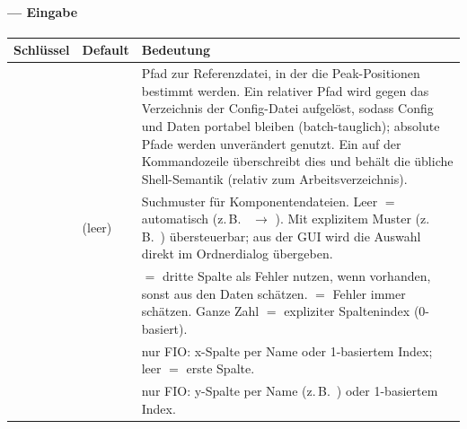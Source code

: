 \documentclass[11pt,a4paper]{article}
\begin{document}
\paragraph{\code{[input]} --- Eingabe}
\begin{table}[h]\small\centering
\begin{tabularx}{\linewidth}{@{}l l L@{}}
\toprule
\textbf{Schl\"ussel} & \textbf{Default} & \textbf{Bedeutung}\\
\midrule
{} &  & Pfad zur Referenzdatei, in der die Peak-Positionen bestimmt werden. Ein relativer Pfad wird gegen das Verzeichnis der Config-Datei aufgel\"ost, sodass Config und Daten portabel bleiben (batch-tauglich); absolute Pfade werden unver\"andert genutzt. Ein  auf der Kommandozeile \"uberschreibt dies und beh\"alt die \"ubliche Shell-Semantik (relativ zum Arbeitsverzeichnis).\\
 &  (leer) & Suchmuster f\"ur Komponentendateien. Leer $=$ automatisch  (z.\,B.\  $\to$ ). Mit explizitem Muster (z.\,B.\ ) \"ubersteuerbar; aus der GUI wird die Auswahl direkt im Ordnerdialog \"ubergeben.\\
 &  &  $=$ dritte Spalte als Fehler nutzen, wenn vorhanden, sonst aus den Daten sch\"atzen.  $=$ Fehler immer sch\"atzen. Ganze Zahl $=$ expliziter Spaltenindex (0-basiert).\\
 &  & nur FIO: x-Spalte per Name oder 1-basiertem Index; leer $=$ erste Spalte.\\
 &  & nur FIO: y-Spalte per Name (z.\,B.\ ) oder 1-basiertem Index.\\
\bottomrule
\end{tabularx}
\end{table}
\end{document}
